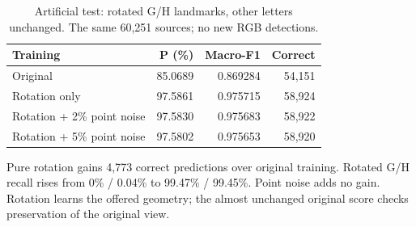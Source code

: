 
\begin{table}[h]\centering\small
\caption{Artificial test: rotated G/H landmarks, other letters unchanged. The same 60,251 sources; no new RGB detections.}
\begin{tabular}{lrrr}\toprule
Training & P (\%) & Macro-F1 & Correct\\\midrule
Original & 85.0689 & 0.869284 & 54,151 \\
Rotation only & 97.5861 & 0.975715 & 58,924 \\
Rotation + 2\% point noise & 97.5830 & 0.975683 & 58,922 \\
Rotation + 5\% point noise & 97.5802 & 0.975653 & 58,920 \\
\bottomrule\end{tabular}\end{table}
Pure rotation gains 4,773 correct predictions over original training. Rotated G/H recall rises from 0\% / 0.04\% to 99.47\% / 99.45\%. Point noise adds no gain. Rotation learns the offered geometry; the almost unchanged original score checks preservation of the original view.
